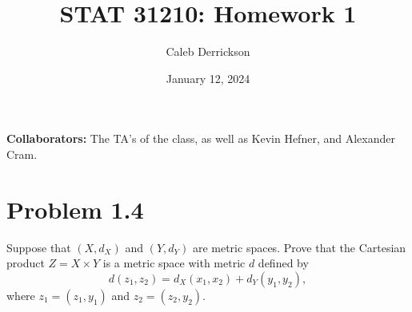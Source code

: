 


\title{STAT 31210: Homework 1}
\author{Caleb Derrickson}
\date{January 12, 2024}


\onehalfspacing
\maketitle
\allowdisplaybreaks
{\color{cit}\vspace{2mm}\noindent\textbf{Collaborators:}} The TA's of the class, as well as Kevin Hefner, and Alexander Cram.

\tableofcontents

\newpage
\section{Problem 1.4}
Suppose that $(X, d_X)$  and $(Y, d_Y)$ are metric spaces. Prove that the Cartesian product $Z = X \times Y$ is a metric space with metric $d$ defined by 
$$d(z_1, z_2) = d_X(x_1, x_2) + d_Y(y_1, y_2),$$
where $z_1 = (z_1, y_1)$ and $z_2 = (z_2, y_2)$.
\partbreak

